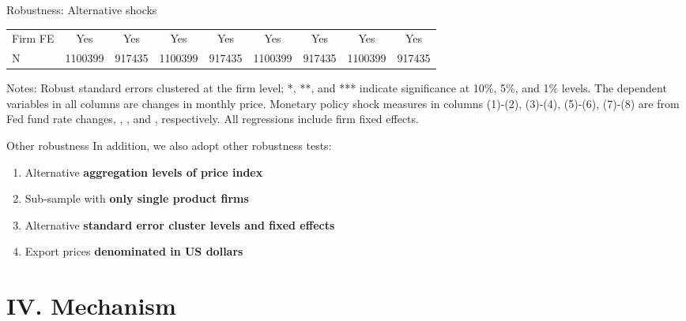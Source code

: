 \documentclass[10pt]{beamer}
\begin{document}
\begin{frame}{Robustness: Alternative shocks}
\begin{table}[htbp]
{\begin{threeparttable}
\begin{tabular}{lcccccccc}
            Firm FE & Yes   & Yes   & Yes   & Yes   & Yes   & Yes   & Yes   & Yes \\
            N     & 1100399 & 917435 & 1100399 & 917435 & 1100399 & 917435 & 1100399 & 917435 \\
            \bottomrule
        \end{tabular}
            \begin{tablenotes}
                \footnotesize
                \item Notes: Robust standard errors clustered at the firm level;  *, **, and *** indicate significance at 10\%, 5\%, and 1\% levels. The dependent variables in all columns are changes in monthly price. Monetary policy shock measures in columns (1)-(2), (3)-(4), (5)-(6), (7)-(8) are from Fed fund rate changes, \cite{nakamura2018high}, \cite{acosta2022perceived}, and \cite{jarocinski2020deconstructing}, respectively. All regressions include firm fixed effects.
    	\end{tablenotes}
        \end{threeparttable}
        }
        \label{tab.altmps}
    \end{table}
\end{frame}

\begin{frame}[label=robustness_other]{Other robustness}
    In addition, we also adopt other robustness tests:
    \medskip
    \begin{enumerate}
        \item Alternative \textbf{aggregation levels of price index} \hyperlink{appendix_tab.altagg}{}
        \item Sub-sample with \textbf{only single product firms} \hyperlink{appendix_tab.single}{}
        \item Alternative \textbf{standard error cluster levels and fixed effects} \hyperlink{appendix_tab.altfe}{}
        \item Export prices \textbf{denominated in US dollars} \hyperlink{appendix_tab.USD}{}
    \end{enumerate}
\end{frame}


\section{IV. Mechanism}
\end{document}
